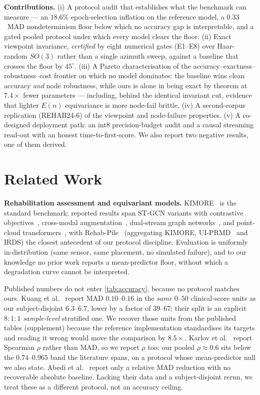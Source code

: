 \documentclass[10pt,twocolumn,letterpaper]{article}
\begin{document}
\noindent\textbf{Contributions.}
(i) A protocol audit that establishes what the benchmark can measure --- an $18.6\%$ epoch-selection
inflation on the reference model, a $0.33$~MAD nondeterminism floor below which no accuracy gap is
interpretable, and a gated pooled protocol under which every model clears the floor. (ii) Exact viewpoint invariance, \emph{certified} by eight numerical gates (E1--E8)
over Haar-random $SO(3)$ rather than a single azimuth sweep, against a baseline that crosses
the floor by $45^\circ$. (iii) A Pareto characterisation of the
accuracy--exactness--robustness--cost frontier on which no model dominates: the baseline wins clean
accuracy \emph{and} node robustness, while ours is alone in being exact by theorem at $7.4\times$ fewer
parameters --- including, behind the identical invariant cut, evidence that lighter $E(n)$ equivariance
is more node-fail brittle. (iv) A second-corpus replication (REHAB24-6) of the viewpoint and node-failure
properties. (v) A co-designed deployment path: an int8 precision-budget audit and a causal streaming
read-out with an honest time-to-first-score. We also report two negative results, one of them derived.

\section{Related Work}\label{sec:related}
\textbf{Rehabilitation assessment and equivariant models.} KIMORE~\cite{capecci2019kimore} is the
standard benchmark; reported results span ST-GCN variants with contrastive
objectives~\cite{karlov2024}, cross-modal augmentation~\cite{abedi2023}, dual-stream graph
networks~\cite{kuang2026}, and point-cloud transformers~\cite{pct2026}, with
Rehab-Pile~\cite{rehabpile2026} (aggregating KIMORE, UI-PRMD~\cite{vakanski2018uiprmd} and IRDS) the closest antecedent of our protocol discipline. Evaluation is
uniformly in-distribution (same sensor, same placement, no simulated failure), and to our knowledge no
prior work reports a mean-predictor floor, without which a degradation curve cannot be interpreted.

Published numbers do not enter \cref{tab:accuracy}, because no protocol matches ours. Kuang et
al.~\cite{kuang2026} report MAD $0.10$--$0.16$ in the \emph{same} $0$--$50$ clinical-score units as our
subject-disjoint $6.3$--$6.7$, lower by a factor of $39$--$67$; their split is an explicit $8{:}1{:}1$
\emph{sample-level} stratified one. We recover those units from the published tables (supplement)
because the reference implementation standardises its targets and reading it wrong would move the
comparison by $8.5\times$. Karlov et al.~\cite{karlov2024} report Spearman $\rho$ rather than MAD, so we
report $\rho$ too: our pooled $\rho\!\approx\!0.6$ sits below the $0.74$--$0.965$ band the literature
spans, on a protocol whose mean-predictor null we also state. Abedi et al.~\cite{abedi2023} report only
a relative MAD reduction with no recoverable absolute baseline. Lacking their data and a
subject-disjoint rerun, we treat these as a different protocol, not an accuracy ceiling.
\end{document}
